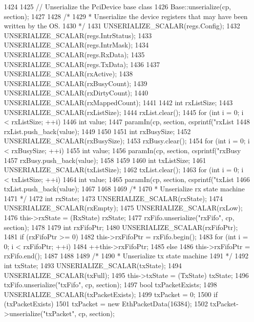 \begin{DoxyCode}
1424 {
1425     // Unserialize the PciDevice base class
1426     Base::unserialize(cp, section);
1427 
1428     /*
1429      * Unserialize the device registers that may have been written by the OS.
1430      */
1431     UNSERIALIZE_SCALAR(regs.Config);
1432     UNSERIALIZE_SCALAR(regs.IntrStatus);
1433     UNSERIALIZE_SCALAR(regs.IntrMask);
1434     UNSERIALIZE_SCALAR(regs.RxData);
1435     UNSERIALIZE_SCALAR(regs.TxData);
1436 
1437     UNSERIALIZE_SCALAR(rxActive);
1438     UNSERIALIZE_SCALAR(rxBusyCount);
1439     UNSERIALIZE_SCALAR(rxDirtyCount);
1440     UNSERIALIZE_SCALAR(rxMappedCount);
1441 
1442     int rxListSize;
1443     UNSERIALIZE_SCALAR(rxListSize);
1444     rxList.clear();
1445     for (int i = 0; i < rxListSize; ++i) {
1446         int value;
1447         paramIn(cp, section, csprintf("rxList%
1448         rxList.push_back(value);
1449     }
1450 
1451     int rxBusySize;
1452     UNSERIALIZE_SCALAR(rxBusySize);
1453     rxBusy.clear();
1454     for (int i = 0; i < rxBusySize; ++i) {
1455         int value;
1456         paramIn(cp, section, csprintf("rxBusy%
1457         rxBusy.push_back(value);
1458     }
1459 
1460     int txListSize;
1461     UNSERIALIZE_SCALAR(txListSize);
1462     txList.clear();
1463     for (int i = 0; i < txListSize; ++i) {
1464         int value;
1465         paramIn(cp, section, csprintf("txList%
1466         txList.push_back(value);
1467     }
1468 
1469     /*
1470      * Unserialize rx state machine
1471      */
1472     int rxState;
1473     UNSERIALIZE_SCALAR(rxState);
1474     UNSERIALIZE_SCALAR(rxEmpty);
1475     UNSERIALIZE_SCALAR(rxLow);
1476     this->rxState = (RxState) rxState;
1477     rxFifo.unserialize("rxFifo", cp, section);
1478 
1479     int rxFifoPtr;
1480     UNSERIALIZE_SCALAR(rxFifoPtr);
1481     if (rxFifoPtr >= 0) {
1482         this->rxFifoPtr = rxFifo.begin();
1483         for (int i = 0; i < rxFifoPtr; ++i)
1484             ++this->rxFifoPtr;
1485     } else {
1486         this->rxFifoPtr = rxFifo.end();
1487     }
1488 
1489     /*
1490      * Unserialize tx state machine
1491      */
1492     int txState;
1493     UNSERIALIZE_SCALAR(txState);
1494     UNSERIALIZE_SCALAR(txFull);
1495     this->txState = (TxState) txState;
1496     txFifo.unserialize("txFifo", cp, section);
1497     bool txPacketExists;
1498     UNSERIALIZE_SCALAR(txPacketExists);
1499     txPacket = 0;
1500     if (txPacketExists) {
1501         txPacket = new EthPacketData(16384);
1502         txPacket->unserialize("txPacket", cp, section);
}}
\end{DoxyCode}
